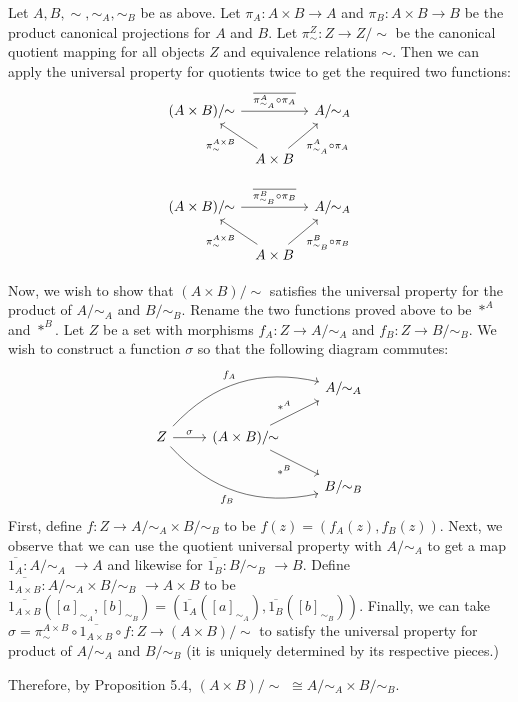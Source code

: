 \documentclass[12pt,letterpaper,boxed]{hmcpset}
\newcommand{\quotuniv}[1]{\overline{#1}}
\newcommand{\quot}[2]{#1/\!\!#2\,\,}
\newcommand{\quotntws}[2]{#1/\!\!#2}
\begin{document}
\begin{solution}
	Let $A,B,\sim,\sim_A,\sim_B$ be as above. Let $\pi_A:A\times B\to A$ and
	$\pi_B:A\times B\to B$ be the product canonical projections for $A$ and $B$. Let
	$\pi^Z_\sim:Z\to\quotntws{Z}{\sim}$ be the canonical quotient mapping for all
	objects $Z$ and equivalence relations $\sim$. Then we can apply the universal
	property for quotients twice to get the required two functions:
	\[\begin{tikzcd}[column sep=tiny]
	\quotntws{(A\times B)}{\sim} \arrow[rr,"\quotuniv{\pi^A_{\sim_A}\circ\pi_A}"] && \quotntws{A}{\sim_A} \\
	&A\times B \arrow[ul,"\pi^{A\times B}_\sim"] \arrow[ur,swap, "\pi^A_{\sim_A}\circ\pi_A"]&
	\end{tikzcd}\]
	
	\[\begin{tikzcd}[column sep=tiny]
	\quotntws{(A\times B)}{\sim} \arrow[rr,"\quotuniv{\pi^B_{\sim_B}\circ\pi_B}"] && \quotntws{A}{\sim_A} \\
	&A\times B \arrow[ul,"\pi^{A\times B}_\sim"] \arrow[ur,swap, "\pi^B_{\sim_B}\circ\pi_B"]&
	\end{tikzcd}\]
	
	\def \quotA {\quotntws{A}{\sim_A}}
	\def \quotB {\quotntws{B}{\sim_B}}
	
	Now, we wish to show that $\quotntws{(A\times B)}{\sim}$ satisfies the universal
	property for the product of $\quotA$ and $\quotB$. Rename the two functions
	proved above to be $*^A$ and $*^B$. Let $Z$ be a set with morphisms
	$f_A:Z\to\quotA$ and $f_B:Z\to\quotB$. We wish to construct a function $\sigma$
	so that the following diagram commutes:
	\[\begin{tikzcd}
	&& \quotntws{A}{\sim_A} \\
	Z\arrow[r,"\sigma"]\arrow[urr,bend left,"f_A"]\arrow[drr,bend right,swap,"f_B"]
	&\quotntws{(A\times B)}{\sim}\arrow[ur,"*^A"]\arrow[dr,swap,"*^B"] \\
	&& \quotntws{B}{\sim_B}
	\end{tikzcd}\]
	\def \quotAB {\quotA\times\quotB}
	First, define $f:Z\to\quotAB$ to be $f(z)=(f_A(z),f_B(z))$. Next, we observe
	that we can use the quotient universal property with $\quotA$ to get a map
	$\quotuniv{1_A}:\quotA\,\,\to A$ and likewise for $\quotuniv{1_B}:\quotB\,\,\to
	B$. Define $\quotuniv{1_{A\times B}}:\quotAB\,\,\to A\times B$ to be
	$\quotuniv{1_{A\times B}}([a]_{\sim_A},[b]_{\sim_B}) =
	(\quotuniv{1_A}([a]_{\sim_A}), \quotuniv{1_B}([b]_{\sim_B}))$. Finally, we can
	take $\sigma=\pi^{A\times B}_\sim \circ \quotuniv{1_{A\times B}} \circ
	f:Z\to\quotntws{(A\times B)}{\sim}$ to satisfy the universal property for
	product of $\quotA$ and $\quotB$ (it is uniquely determined by its respective
	pieces.)
	
	Therefore, by Proposition 5.4, $\quot{(A\times B)}{\sim}\cong\quotA \times
	\quotB$.
\end{solution}
\end{document}

